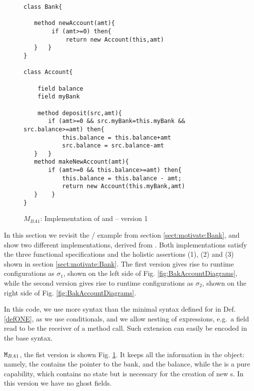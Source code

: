 \begin{figure}[thb]
\begin{lstlisting}
class Bank{

   method newAccount(amt){
        if (amt>=0) then{
            return new Account(this,amt)
   }   }
}

class Account{

    field balance
    field myBank
    
    method deposit(src,amt){
       if (amt>=0 && src.myBank=this.myBank && src.balance>=amt) then{
           this.balance = this.balance+amt
           src.balance = src.balance-amt
   }   }
   method makeNewAccount(amt){
       if (amt>=0 && this.balance>=amt) then{
           this.balance = this.balance - amt;
           return new Account(this.myBank,amt)
   }    }
}
\end{lstlisting}
 \vspace*{-7mm}
\caption{$M_{BA1}$: Implementation of  and  -- version 1}
\label{fig:BanAccImplV1}
\end{figure}

In this section we revisit the / example from
 section  \ref{sect:motivate:Bank}, and show two different
 implementations, derived from \citet{arnd18} . Both implementations  satisfy the three functional specifications and the holistic assertions
 (1), (2) and (3)  shown in section \ref{sect:motivate:Bank}.
 The first version gives rise to runtime configurations as $\sigma_1$, 
 shown on the left side of Fig. \ref{fig:BakAccountDiagrams}, while the
 second version gives rise to runtime configurations as $\sigma_2$,
 shown on the right side of Fig. \ref{fig:BakAccountDiagrams}. 

 In this code, we use more syntax than the minimal syntax defined for \LangOO in Def. \ref{defONE}, as we use conditionals, and we allow nesting of expressions, e.g.\ a field read to be the receiver of a method call. Such extension can easily be encoded in the base syntax.

${\mbox{\tt{\ensuremath{{\mbox{\tt{M}}}}}}}_{BA1}$, the fist version is shown Fig. \ref{fig:BanAccImplV1}. It keeps all the information in the  object: namely,
the  contains the pointer to the bank, and the balance, while the  is a pure capability, which contains
no state but is necessary for the creation of new s.
In this version we have no ghost fields.

